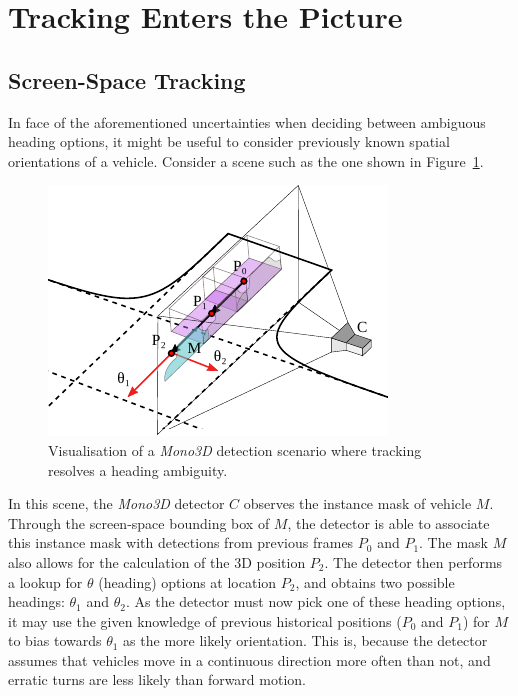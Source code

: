 
\section{Tracking Enters the Picture}
\label{sec:tracking}

\subsection{Screen-Space Tracking}
\label{subsec:sstracking}

In face of the aforementioned uncertainties when deciding between ambiguous heading options, it might be useful to consider previously known spatial orientations of a vehicle.
Consider a scene such as the one shown in Figure~\ref{fig:tracking}.

\begin{figure}[htb]
    \centering
    \includegraphics[width=0.7\linewidth]{figures/tracking}
    \caption{Visualisation of a \textit{Mono3D} detection scenario where tracking resolves a heading ambiguity.}
    \label{fig:tracking}
\end{figure}

In this scene, the \textit{Mono3D} detector $C$ observes the instance mask of vehicle $M$.
Through the screen-space bounding box of $M$, the detector is able to associate this instance mask with detections from previous frames \textemdash $P_0$ and $P_1$.
The mask $M$ also allows for the calculation of the 3D position $P_2$.
The detector then performs a lookup for $\theta$ (heading) options at location $P_2$, and obtains two possible headings: $\theta_1$ and $\theta_2$.
As the detector must now pick one of these heading options, it may use the given knowledge of previous historical positions ($P_0$ and $P_1$) for $M$ to bias towards $\theta_1$ as the more likely orientation.
This is, because the detector assumes that vehicles move in a continuous direction more often than not, and erratic turns are less likely than forward motion.

